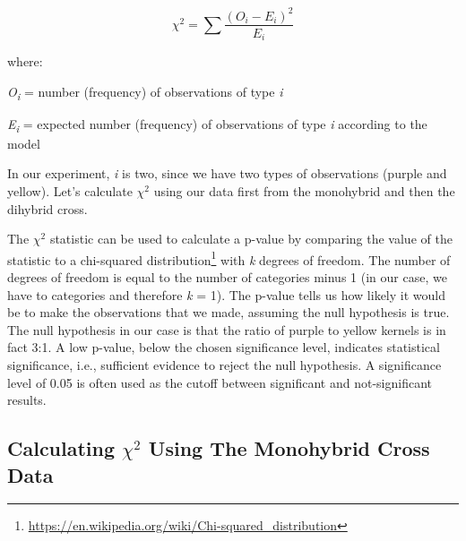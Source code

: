 \documentclass[]{book}
\let\rmarkdownfootnote\footnote%
\def\footnote{\protect\rmarkdownfootnote}
\renewcommand{\href}[2]{#2\footnote{\url{#1}}}
\theoremstyle{definition}
\theoremstyle{definition}
\theoremstyle{definition}
\theoremstyle{remark}
\begin{document}
\[ \chi^2=\sum\frac{(O_{i}-E_{i})^{2}}{E_{i}} \]

where:

\emph{O\textsubscript{i}} = number (frequency) of observations of type
\emph{i}

\emph{E\textsubscript{i}} = expected number (frequency) of observations
of type \emph{i} according to the model

In our experiment, \emph{i} is two, since we have two types of
observations (purple and yellow). Let's calculate \(\chi^2\) using our
data first from the monohybrid and then the dihybrid cross.

The \(\chi^2\) statistic can be used to calculate a p-value by comparing
the value of the statistic to a
\href{https://en.wikipedia.org/wiki/Chi-squared_distribution}{chi-squared
distribution} with \emph{k} degrees of freedom. The number of degrees of
freedom is equal to the number of categories minus 1 (in our case, we
have to categories and therefore \emph{k} = 1). The p-value tells us how
likely it would be to make the observations that we made, assuming the
null hypothesis is true. The null hypothesis in our case is that the
ratio of purple to yellow kernels is in fact 3:1. A low p-value, below
the chosen significance level, indicates statistical significance, i.e.,
sufficient evidence to reject the null hypothesis. A significance level
of 0.05 is often used as the cutoff between significant and
not-significant results.

\subsection{\texorpdfstring{Calculating \(\chi^2\) Using The Monohybrid
Cross
Data}{Calculating \textbackslash{}chi\^{}2 Using The Monohybrid Cross Data}}\label{calculating-chi2-using-the-monohybrid-cross-data}
\end{document}
